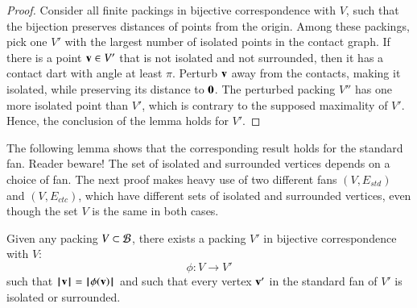\begin{proof} Consider all finite packings in 
bijective correspondence with $V$, such that the
bijection preserves distances of points from the origin.
Among these packings, pick one $V'$ with the largest number
of isolated points in the contact graph.  If there is a point ${\mathbf v}\in V'$ that
is not isolated and not surrounded, then it has a contact
dart with angle at least $\pi$.   Perturb ${\mathbf v}$ away from the contacts, making it isolated, while preserving its distance to ${\mathbf 0}$.  The perturbed packing $V''$ has one more isolated point than $V'$, which is contrary to the supposed maximality of $V'$.  Hence, the conclusion of the 
lemma holds for $V'$.
\end{proof}

The following lemma shows that the corresponding result
holds for the standard fan.  Reader beware!  The set of isolated and surrounded vertices depends on a 
choice of fan.  The next proof makes heavy use of two different fans $(V,E_{std})$ and $(V,E_{ctc})$,
which have different sets of isolated and surrounded vertices, even though the set $V$ is
the same in both cases.



\begin{lemma}\label{lemma:surrounded}  %
Given any packing $V\subset {\mathcal B}$,
there exists a  packing $V'$ 
in bijective correspondence with $V$:
$$
\phi:V\to V'
$$
such that ${{\hskip0.1em|\hskip-0.15em|\hskip0.1em}{\mathbf v}{\hskip0.1em|\hskip-0.15em|\hskip0.1em}} = {{\hskip0.1em|\hskip-0.15em|\hskip0.1em}\phi({\mathbf v}){\hskip0.1em|\hskip-0.15em|\hskip0.1em}}$ and
such that every vertex ${\mathbf v}'$ in the standard fan of $V'$
is isolated or surrounded.
%
\end{lemma}

